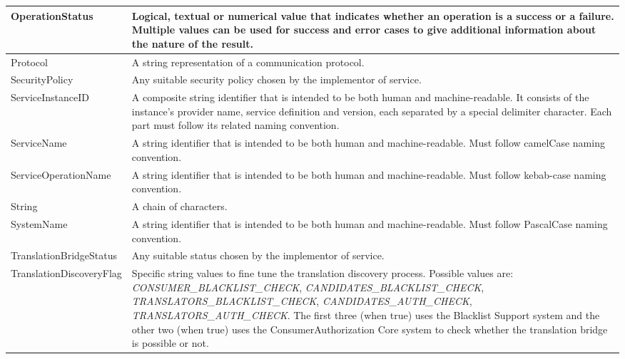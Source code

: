 \documentclass[a4paper]{arrowhead}
\newcommand{\pdef}[1]{{\textcolor{ArrowheadGrey}{#1\label{sec:model:primitives:#1}\label{sec:model:primitives:#1s}\label{sec:model:primitives:#1es}}}}
\begin{document}
\begin{table}[ht!]
\begin{tabularx}{\textwidth}{| p{5cm} | X |} \hline
\pdef{OperationStatus}  & Logical, textual or numerical value that indicates whether an operation is a success or a failure. Multiple values can be used for success and error cases to give additional information about the nature of the result. \\ \hline
\pdef{Protocol}         & A string representation of a communication protocol. \\ \hline
\pdef{SecurityPolicy}   & Any suitable security policy chosen by the implementor of service. \\ \pdef{ServiceInstanceID} & A composite string identifier that is intended to be both human and machine-readable. It consists of the instance's provider name, service definition and version, each separated by a special delimiter character. Each part must follow its related naming convention. \\ \hline
\pdef{ServiceName}      & A string identifier that is intended to be both human and machine-readable. Must follow camelCase naming convention. \\ \hline
\pdef{ServiceOperationName} & A string identifier that is intended to be both human and machine-readable. Must follow kebab-case naming convention. \\ \hline
\pdef{String}           & A chain of characters. \\ \hline
\pdef{SystemName}       & A string identifier that is intended to be both human and machine-readable. Must follow PascalCase naming convention. \\ \hline
\pdef{TranslationBridgeStatus} & Any suitable status chosen by the implementor of service. \\ \hline
\pdef{TranslationDiscoveryFlag} & Specific string values to fine tune the translation discovery process. Possible values are: \textit{CONSUMER\_BLACKLIST\_CHECK}, \textit{CANDIDATES\_BLACKLIST\_CHECK}, \textit{TRANSLATORS\_BLACKLIST\_CHECK}, \textit{CANDIDATES\_AUTH\_CHECK},  \textit{TRANSLATORS\_AUTH\_CHECK}. The first three (when true) uses the Blacklist Support system and the other two (when true) uses the ConsumerAuthorization Core system to check whether the translation bridge is possible or not. \\ \hline
\end{tabularx}
\end{table}

\newpage
\end{document}
